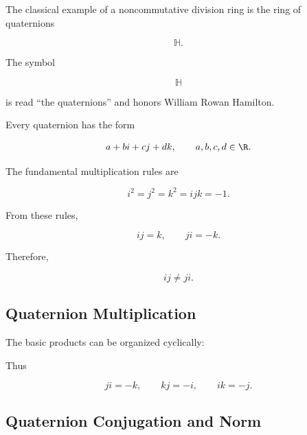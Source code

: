 The classical example of a noncommutative division ring is the ring of
quaternions

\[ \mathbb H. \]

The symbol

\[ \mathbb H \]

is read ``the quaternions'' and honors William Rowan Hamilton.

Every quaternion has the form

\[ a+bi+cj+dk,\qquad a,b,c,d\in\R. \]

The fundamental multiplication rules are

\[ i^2=j^2=k^2=ijk=-1. \]

From these rules,

\[ ij=k,\qquad ji=-k. \]

Therefore,

\[ ij\neq ji. \]

\subsection{Quaternion Multiplication}
\label{subsec:quaternion-multiplication}

The basic products can be organized cyclically:

\begin{center}
\end{center}

Thus

\[ ji=-k,\qquad kj=-i,\qquad ik=-j. \]

\subsection{Quaternion Conjugation and Norm}
\label{subsec:quaternion-conjugation}

